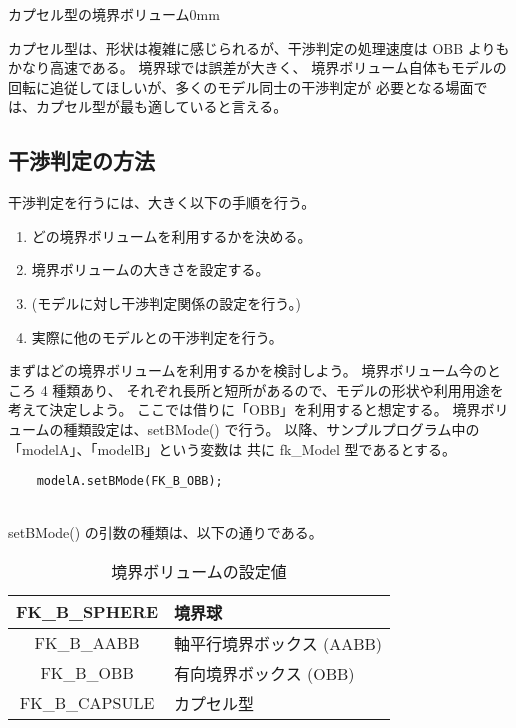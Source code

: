 	{カプセル型の境界ボリューム}{0mm}

カプセル型は、形状は複雑に感じられるが、干渉判定の処理速度は OBB よりもかなり高速である。
境界球では誤差が大きく、
境界ボリューム自体もモデルの回転に追従してほしいが、多くのモデル同士の干渉判定が
必要となる場面では、カプセル型が最も適していると言える。

\subsection{干渉判定の方法}
干渉判定を行うには、大きく以下の手順を行う。
\begin{enumerate}
 \item どの境界ボリュームを利用するかを決める。
 \item 境界ボリュームの大きさを設定する。
 \item (モデルに対し干渉判定関係の設定を行う。)
 \item 実際に他のモデルとの干渉判定を行う。
\end{enumerate}
まずはどの境界ボリュームを利用するかを検討しよう。
境界ボリューム今のところ 4 種類あり、
それぞれ長所と短所があるので、モデルの形状や利用用途を考えて決定しよう。
ここでは借りに「OBB」を利用すると想定する。
境界ボリュームの種類設定は、setBMode() で行う。
以降、サンプルプログラム中の「modelA」、「modelB」という変数は
共に fk\_Model 型であるとする。
\\
\begin{breakbox}
\begin{verbatim}
    modelA.setBMode(FK_B_OBB);
\end{verbatim}
\end{breakbox}
~ \\
setBMode() の引数の種類は、以下の通りである。
\begin{table}[H]
\caption{境界ボリュームの設定値}
\label{tbl:bmode}
\begin{center}
\begin{tabular}{|c|l|}
\hline
FK\_B\_SPHERE & 境界球 \\ \hline
FK\_B\_AABB & 軸平行境界ボックス (AABB) \\ \hline
FK\_B\_OBB & 有向境界ボックス (OBB) \\ \hline
FK\_B\_CAPSULE & カプセル型 \\ \hline
\end{tabular}
\end{center}
\end{table}

